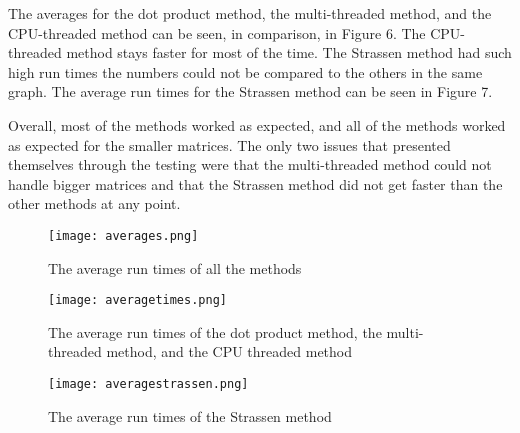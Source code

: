 \documentclass[conference]{IEEEtran}
\begin{document}
    The averages for the dot product method, the multi-threaded method, and the CPU-threaded method can be seen, in comparison, in Figure 6. The CPU-threaded method stays faster for most of the time. The Strassen method had such high run times the numbers could not be compared to the others in the same graph. The average run times for the Strassen method can be seen in Figure 7.  

    Overall, most of the methods worked as expected, and all of the methods worked as expected for the smaller matrices. The only two issues that presented themselves through the testing were that the multi-threaded method could not handle bigger matrices and that the Strassen method did not get faster than the other methods at any point.
    
\begin{figure}
    \centering
    \texttt{[image: averages.png]}
    \caption{The average run times of all the methods}
    \label{fig:averages}
\end{figure}
    
\begin{figure}
    \centering
    \texttt{[image: averagetimes.png]}
    \caption{The average run times of the dot product method, the multi-threaded method, and the CPU threaded method}
    \label{fig:averagetimes}
\end{figure}
    
\begin{figure}
    \centering
    \texttt{[image: averagestrassen.png]}
    \caption{The average run times of the Strassen method}
    \label{fig:averagestrassentimes}
\end{figure}
\end{document}

